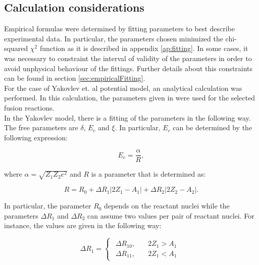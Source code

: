 \documentclass[openany]{book}
\begin{document}
 
 
\subsection{Calculation considerations} \label{sub:considerationsNonResonant}

Empirical formulas were determined by fitting parameters to best describe experimental data. In particular, the parameters chosen minimized the chi-squared $\chi^2$ function as it is described in appendix \ref{ap:fitting}. In some cases, it was necessary to constraint the interval of validity of the parameters in order to avoid unphysical behaviour of the fittings. Further details about this constraints can be found in section \ref{sec:empiricalFitting}. \\

For the case of Yakovlev et. al potential model, an analytical calculation was performed. In this calculation, the parameters given in \cite{yakovlev_beard_gasques_wiescher_2010} were used for the selected fusion reactions.  \\

In the Yakovlev model, there is a fitting of the parameters in the following way.  The free parameters are $\delta$, $E_c$ and $\xi$. In particular, $E_c$ can be determined by the following expression:

\begin{equation} \label{eq:potential_Yakovlev_Ec}
	E_c = \frac{\alpha}{R},
\end{equation}

where $\alpha = \sqrt{Z_1Z_2e^2}$ and $R$ is a parameter that is determined as:

\begin{equation} \label{eq:potential_Yakovlev_R}
	R = R_0 + \Delta R_{1} |2Z_1 - A_1| + \Delta R_{2}|2Z_2 - A_2|.
\end{equation}

In particular, the parameter $R_0$ depends on the reactant nuclei while the parameters $\Delta R_{1}$ and $\Delta R_{2}$ can assume two values per pair of reactant nuclei. For instance, the values are given in the following way: 

\begin{equation} \label{eq:potential_Yakovlev_R1}
	\Delta R_1= 	\left\{\begin{array}{l}
		\begin{split}
			\Delta R_{10}, \quad & 2Z_1 > A_1\\ 
			\Delta R_{11}, \quad & 2Z_1 < A_1
		\end{split}
	\end{array}\right.
\end{equation}
\end{document}
